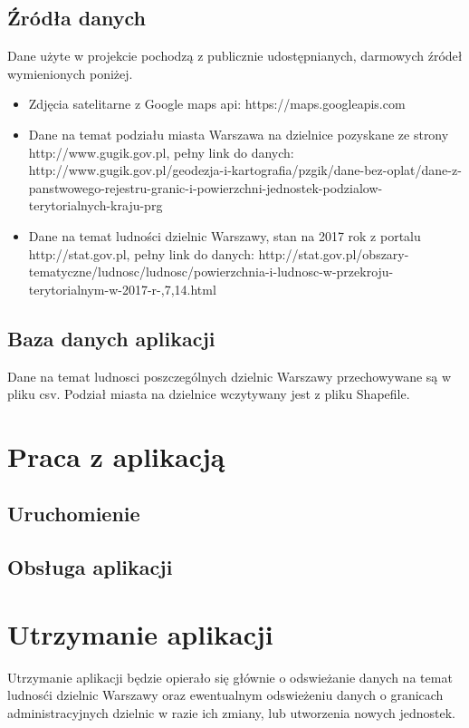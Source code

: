 \documentclass[a4paper,12p]{article}
\begin{document}
	\subsection{Źródła danych}
		Dane użyte w projekcie pochodzą z publicznie udostępnianych, darmowych źródeł wymienionych poniżej.
	
	\begin{itemize}
	\item Zdjęcia satelitarne z Google maps api: https://maps.googleapis.com
	\item Dane na temat podziału miasta Warszawa na dzielnice pozyskane ze strony http://www.gugik.gov.pl, pełny link do danych: http://www.gugik.gov.pl/geodezja-i-kartografia/pzgik/dane-bez-oplat/dane-z-panstwowego-rejestru-granic-i-powierzchni-jednostek-podzialow-terytorialnych-kraju-prg
	\item Dane na temat ludności dzielnic Warszawy, stan na 2017 rok z portalu http://stat.gov.pl, pełny link do danych: http://stat.gov.pl/obszary-tematyczne/ludnosc/ludnosc/powierzchnia-i-ludnosc-w-przekroju-terytorialnym-w-2017-r-,7,14.html
	\end{itemize}

	\subsection{Baza danych aplikacji}
	Dane na temat ludnosci poszczególnych dzielnic Warszawy przechowywane są w pliku csv. Podział miasta na dzielnice wczytywany jest z pliku Shapefile.

	\section{Praca z aplikacją}
		\subsection{Uruchomienie}

		\subsection{Obsługa aplikacji}

	\section{Utrzymanie aplikacji}
		Utrzymanie aplikacji będzie opierało się głównie o odswieżanie danych na temat ludnosći dzielnic Warszawy oraz ewentualnym odswieżeniu danych o granicach administracyjnych dzielnic w razie ich zmiany, lub utworzenia nowych jednostek.
\end{document}
